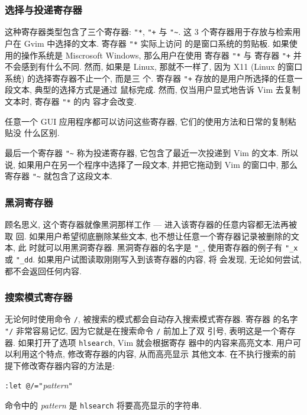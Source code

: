 \subsubsection{选择与投递寄存器}
\label{subsubsec:the_selection_and_drop_registers}

这种寄存器类型包含了三个寄存器: \texttt{"*}, \texttt{"+} 与 \verb'"~'. 这 3
个寄存器用于存放与检索用户在 Gvim 中选择的文本. 寄存器 \texttt{"*} 实际上访问
的是窗口系统的剪贴板. 如果使用的操作系统是 Miscrosoft Windows, 那么用户在使用
寄存器 \texttt{"*} 与 寄存器 \texttt{"+} 并不会感到有什么不同. 然而, 如果是
Linux, 那就不一样了, 因为 X11 (Linux 的窗口系统) 的选择寄存器不止一个, 而是三
个. 寄存器 \texttt{"+} 存放的是用户所选择的任意一段文本, 典型的选择方式是通过
鼠标完成. 然而, 仅当用户显式地告诉 Vim 去复制文本时, 寄存器 \texttt{"*} 的内
容才会改变.

任意一个 GUI 应用程序都可以访问这些寄存器, 它们的使用方法和日常的复制粘贴没
什么区别.

最后一个寄存器 \verb'"~' 称为投递寄存器, 它包含了最近一次投递到 Vim 的文本.
所以说, 如果用户在另一个程序中选择了一段文本, 并把它拖动到 Vim 的窗口中, 那么
寄存器 \verb'"~' 就包含了这段文本.

\subsubsection{黑洞寄存器}
\label{subsubsec:the_black_hole_register}

顾名思义, 这个寄存器就像黑洞那样工作 --- 进入该寄存器的任意内容都无法再被取
回. 如果用户希望彻底删除某些文本, 也不想让任意一个寄存器记录被删除的文本, 此
时就可以用黑洞寄存器. 黑洞寄存器的名字是 \texttt{"\_}, 使用寄存器的例子有
\texttt{"\_x} 或 \texttt{"\_dd}. 如果用户试图读取刚刚写入到该寄存器的内容, 将
会发现, 无论如何尝试, 都不会返回任何内容.

\subsubsection{搜索模式寄存器}
\label{subsubsec:search_pattern_register}

无论何时使用命令 \texttt{/}, 被搜索的模式都会自动存入搜索模式寄存器. 寄存器
的名字 \texttt{"/} 非常容易记忆, 因为它就是在搜索命令 \texttt{/} 前加上了双
引号, 表明这是一个寄存器. 如果打开了选项 \texttt{hlsearch}, Vim 就会根据寄存
器中的内容来高亮文本. 用户可以利用这个特点, 修改寄存器的内容, 从而高亮显示
其他文本. 在不执行搜索的前提下修改寄存器内容的方法是:
\begin{vimcmdform}
    \texttt{:let @/="}\textit{pattern}\texttt{"}
\end{vimcmdform}
命令中的 \textit{pattern} 是 \texttt{hlsearch} 将要高亮显示的字符串.

